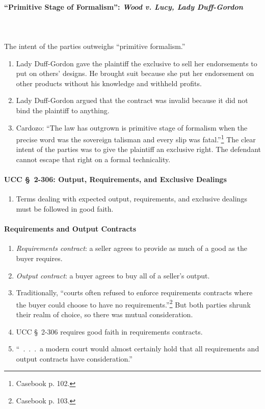 \paragraph{``Primitive Stage of Formalism'': \emph{Wood v. Lucy, Lady 
Duff-Gordon}}
~\\\\
The intent of the parties outweighs ``primitive formalism.''

\begin{enumerate}
    \item Lady Duff-Gordon gave the plaintiff the exclusive to sell her 
    endorsements to put on others' designs. He brought suit because she put 
    her endorsement on other products without his knowledge and withheld 
    profits.
    \item Lady Duff-Gordon argued that the contract was invalid because it did 
    not bind the plaintiff to anything.
    \item Cardozo: ``The law has outgrown is primitive stage of formalism when 
    the precise word was the sovereign talisman and every slip was 
    fatal.''\footnote{Casebook p. 102.} The clear intent of the parties was to 
    give the plaintiff an exclusive right. The defendant cannot escape that 
    right on a formal technicality.
\end{enumerate}

\paragraph{UCC \S\ 2-306: Output, Requirements, and Exclusive Dealings}

\begin{enumerate}
    \item Terms dealing with expected output, requirements, and exclusive 
    dealings must be followed in good faith.
\end{enumerate}

\paragraph{Requirements and Output Contracts}

\begin{enumerate}
    \item \emph{Requirements contract}: a seller agrees to provide as much of 
    a good as the buyer requires.
    \item \emph{Output contract}: a buyer agrees to buy all of a seller's 
    output.
    \item Traditionally, ``courts often refused to enforce requirements 
    contracts where the buyer could choose to have no 
    requirements.''\footnote{Casebook p. 103.} But both parties shrunk their 
    realm of choice, so there was mutual consideration.
    \item UCC \S\ 2-306 requires good faith in requirements contracts.
    \item ``~.~.~.~a modern court would almost certainly hold that all 
    requirements and output contracts have consideration.''
\end{enumerate}

